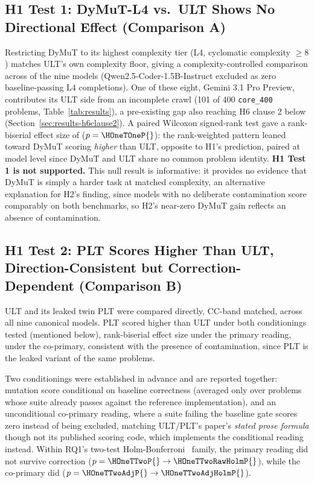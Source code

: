 \subsection{H1 Test 1: DyMuT-L4 vs.\ ULT Shows No Directional Effect (Comparison A)}
\label{sec:results-h1test1}
Restricting DyMuT to its highest complexity tier (L4, cyclomatic complexity ${\geq}8$) matches ULT's own complexity floor, giving a complexity-controlled comparison across \HOneTOneN{} of the nine models (Qwen2.5-Coder-1.5B-Instruct excluded as zero baseline-passing L4 completions). One of these eight, Gemini 3.1 Pro Preview, contributes its ULT side from an incomplete crawl (101 of 400 \texttt{core\_400} problems, Table~\ref{tab:results}), a pre-existing gap also reaching H6 clause 2 below (Section~\ref{sec:results-h6clause2}). A paired Wilcoxon signed-rank test gave a rank-biserial effect size of \HOneTOneEffectR{} ($p=\HOneTOneP{}$): the rank-weighted pattern leaned toward DyMuT scoring \emph{higher} than ULT, opposite to H1's prediction, paired at model level since DyMuT and ULT share no common problem identity. \textbf{H1 Test 1 is not supported.} This null result is informative: it provides no evidence that DyMuT is simply a harder task at matched complexity, an alternative explanation for H2's finding, since models with no deliberate contamination score comparably on both benchmarks, so H2's near-zero DyMuT gain reflects an absence of contamination. %

\subsection{H1 Test 2: PLT Scores Higher Than ULT, Direction-Consistent but Correction-Dependent (Comparison B)}
\label{sec:results-h1test2}
ULT and its leaked twin PLT were compared directly, CC-band matched, across all nine canonical models. PLT scored higher than ULT under both conditionings tested (mentioned below), rank-biserial effect size \HOneTTwoEffectR{} under the primary reading, \HOneTTwoAdjEffectR{} under the co-primary, consistent with the presence of contamination, since PLT is the leaked variant of the same problems.

Two conditionings were established in advance and are reported together: mutation score conditional on baseline correctness (averaged only over problems whose suite already passes against the reference implementation), and an unconditional co-primary reading, where a suite failing the baseline gate scores zero instead of being excluded, matching ULT/PLT's paper's \emph{stated prose formula} though not its published scoring code, which implements the conditional reading instead. Within RQ1's two-test Holm-Bonferroni~\cite{holm1979simple} family, the primary reading did not survive correction ($p=\HOneTTwoP{}\rightarrow\HOneTTwoRawHolmP{}$), while the co-primary did ($p=\HOneTTwoAdjP{}\rightarrow\HOneTTwoAdjHolmP{}$).

